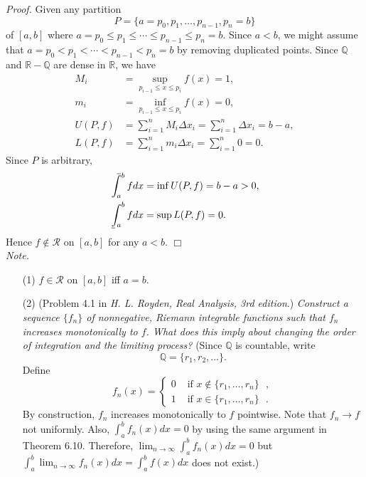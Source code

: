 \documentclass{article}
\def\upint{\mathchoice%
    {\mkern13mu\overline{\vphantom{\intop}\mkern7mu}\mkern-20mu}%
    {\mkern7mu\overline{\vphantom{\intop}\mkern7mu}\mkern-14mu}%
    {\mkern7mu\overline{\vphantom{\intop}\mkern7mu}\mkern-14mu}%
    {\mkern7mu\overline{\vphantom{\intop}\mkern7mu}\mkern-14mu}%
  \int}
\def\lowint{\mkern3mu\underline{\vphantom{\intop}\mkern7mu}\mkern-10mu\int}
\begin{document}
\emph{Proof.}
Given any partition
\[
  P = \{a = p_0, p_1, \ldots, p_{n-1}, p_n = b \}
\]
of $[a,b]$ where $a = p_0 \leq p_1 \leq \cdots \leq p_{n-1} \leq p_n = b$.
Since $a < b$, we might assume that $a = p_0 < p_1 < \cdots < p_{n-1} < p_n = b$
by removing duplicated points.
Since $\mathbb{Q}$ and $\mathbb{R} - \mathbb{Q}$ are dense in $\mathbb{R}$, we have
\begin{align*}
  M_i &= \sup_{p_{i-1} \leq x \leq p_i} f(x) = 1, \\
  m_i &= \inf_{p_{i-1} \leq x \leq p_i} f(x) = 0, \\
  U(P,f) &= \sum_{i=1}^{n} M_i \Delta x_i = \sum_{i=1}^{n} \Delta x_i = b - a, \\
  L(P,f) &= \sum_{i=1}^{n} m_i \Delta x_i = \sum_{i=1}^{n} 0 = 0.
\end{align*}
Since $P$ is arbitrary,
\begin{align*}
  \upint_a^b f dx &= \inf U(P,f) = b-a > 0, \\
  \lowint_a^b f dx &= \sup L(P,f) = 0.
\end{align*}
Hence $f \not\in \mathscr{R}$ on $[a,b]$ for any $a < b$.
$\Box$ \\

\emph{Note.}
\begin{enumerate}
\item[(1)]
  $f \in \mathscr{R}$ on $[a,b]$ iff $a = b$.

\item[(2)]
  (Problem 4.1 in \emph{H. L. Royden, Real Analysis, 3rd edition}.)
  \emph{Construct a sequence $\{f_n\}$ of nonnegative,
  Riemann integrable functions such that $f_n$ increases monotonically to $f$.
  What does this imply about changing the order of integration and the limiting process?}
  (Since $\mathbb{Q}$ is countable, write
  \[
    \mathbb{Q} = \{ r_1, r_2, \ldots \}.
  \]
  Define
  \begin{equation*}
    f_n(x) =
      \begin{cases}
        0 & \text{ if $x \not\in \{ r_1, \ldots, r_n \}$ }, \\
        1 & \text{ if $x \in \{ r_1, \ldots, r_n \}$ }.
      \end{cases}
  \end{equation*}
  By construction, $f_n$ increases monotonically to $f$ pointwise.
  Note that $f_n \to f$ not uniformly.
  Also, $\int_{a}^{b} f_n(x) dx = 0$ by using the same argument in Theorem 6.10.
  Therefore,
  $\lim_{n \to \infty} \int_{a}^{b} f_n(x) dx = 0$
  but $\int_{a}^{b} \lim_{n \to \infty} f_n(x) dx = \int_{a}^{b} f(x) dx$
  does not exist.) \\\\
\end{enumerate}
\end{document}
